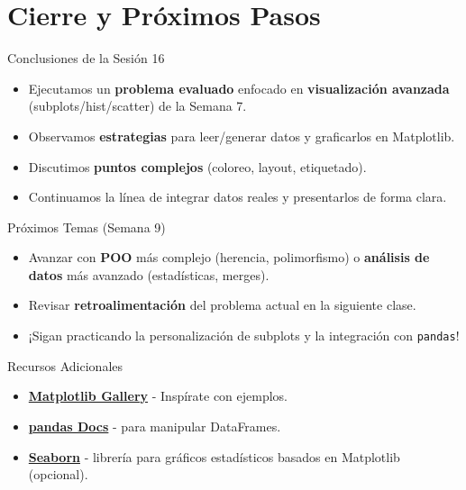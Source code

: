 \documentclass[10pt]{beamer}
\begin{document}
\section{Cierre y Próximos Pasos}

\begin{frame}{Conclusiones de la Sesión 16}
  \begin{itemize}
    \item Ejecutamos un \textbf{problema evaluado} enfocado en \textbf{visualización avanzada} (subplots/hist/scatter) de la Semana 7.
    \item Observamos \textbf{estrategias} para leer/generar datos y graficarlos en Matplotlib.
    \item Discutimos \textbf{puntos complejos} (coloreo, layout, etiquetado).
    \item Continuamos la línea de integrar datos reales y presentarlos de forma clara.
  \end{itemize}
\end{frame}

\begin{frame}{Próximos Temas (Semana 9)}
  \begin{itemize}
    \item Avanzar con \textbf{POO} más complejo (herencia, polimorfismo) o \textbf{análisis de datos} más avanzado (estadísticas, merges).
    \item Revisar \textbf{retroalimentación} del problema actual en la siguiente clase.
    \item ¡Sigan practicando la personalización de subplots y la integración con \texttt{pandas}!
  \end{itemize}
\end{frame}

\begin{frame}{Recursos Adicionales}
  \begin{itemize}
    \item \href{https://matplotlib.org/stable/gallery/index.html}{\textbf{Matplotlib Gallery}} - Inspírate con ejemplos.
    \item \href{https://pandas.pydata.org/}{\textbf{pandas Docs}} - para manipular DataFrames.
    \item \href{https://seaborn.pydata.org/}{\textbf{Seaborn}} - librería para gráficos estadísticos basados en Matplotlib (opcional).
  \end{itemize}
\end{frame}
\end{document}
